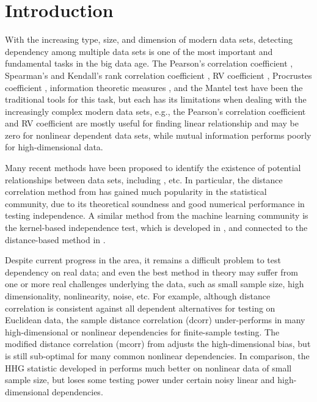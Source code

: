 \documentclass[11pt]{article}
\begin{document}
\clearpage
\tableofcontents


\newpage
{}

\section{Introduction}
\label{sec:intro}
With the increasing type, size, and dimension of modern data sets, detecting dependency among multiple data sets is one of the most important and fundamental tasks in the big data age. The Pearson's correlation coefficient \cite{Pearson1895}, Spearman's and Kendall's rank correlation coefficient \cite{KendallBook}, RV coefficient \cite{RobertEscoufier1976}, Procrustes coefficient \cite{GowerProcrustesBook}, information theoretic measures \cite{Renyi1959}, and the Mantel test \cite{Mantel1967} have been the traditional tools for this task, but each has its limitations when dealing with the increasingly complex modern data sets, e.g., the Pearson's correlation coefficient and RV coefficient are mostly useful for finding linear relationship and may be zero for nonlinear dependent data sets, while mutual information performs poorly for high-dimensional data. 

Many recent methods have been proposed to identify the existence of potential relationships between data sets, including \cite{Baringhaus2004,TaskinenOjaRandles2005, GrettonEtAl2005, SzekelyRizzoBakirov2007, GrettonGyorfi2010,Reshef2011, HellerGorfine2013, Reimherr2013, SzekelyRizzo2013a, SzekelyRizzo2013b, RizzoSzekely2016}, etc. In particular, the distance correlation method from \cite{SzekelyRizzoBakirov2007, SzekelyRizzo2009, SzekelyRizzo2013a, SzekelyRizzo2014} has gained much popularity in the statistical community, due to its theoretical soundness and good numerical performance in testing independence. A similar method from the machine learning community is the kernel-based independence test, which is developed in \cite{GrettonEtAl2005, GrettonGyorfi2010, GrettonEtAl2012}, and connected to the distance-based method in \cite{SejdinovicEtAl2013}.

Despite  current progress in the area, it remains a difficult problem to test dependency on real data; and even the best method in theory may suffer from one or more real challenges underlying the data, such as small sample size, high dimensionality, nonlinearity, noise, etc. For example, although distance correlation is consistent against all dependent alternatives for testing on Euclidean data, the sample distance correlation (dcorr) under-performs in many high-dimensional or nonlinear dependencies for finite-sample testing. The modified distance correlation (mcorr) from \cite{SzekelyRizzo2013a} adjusts the high-dimensional bias, but is still sub-optimal for many common nonlinear dependencies. In comparison, the HHG statistic developed in \cite{HellerGorfine2013} performs much better on nonlinear data of small sample size, but loses some testing power under certain noisy linear and high-dimensional dependencies.
\end{document}
